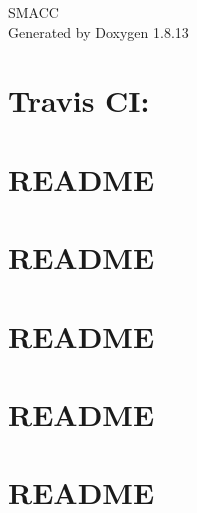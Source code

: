 \documentclass[twoside]{book}
\newcommand{\+}{\discretionary{\mbox{\scriptsize$\hookleftarrow$}}{}{}}
\newcommand{\clearemptydoublepage}{%
  \newpage{\pagestyle{empty}\cleardoublepage}%
}
\begin{document}
\hypersetup{pageanchor=false,
             bookmarksnumbered=true,
             pdfencoding=unicode
            }
\begin{titlepage}
\vspace*{7cm}
\begin{center}%
{\Large S\+M\+A\+CC }\\
\vspace*{1cm}
{\large Generated by Doxygen 1.8.13}\\
\end{center}
\end{titlepage}
\clearemptydoublepage
{}
\tableofcontents
\clearemptydoublepage
{}
\hypersetup{pageanchor=true}

\chapter{Travis CI\+:}
\label{md_README}

\chapter{R\+E\+A\+D\+ME}
\label{md_smacc_client_library_battery_monitor_client_README}

\chapter{R\+E\+A\+D\+ME}
\label{md_smacc_client_library_keyboard_client_README}

\chapter{R\+E\+A\+D\+ME}
\label{md_smacc_client_library_microstrain_mips_client_README}

\chapter{R\+E\+A\+D\+ME}
\label{md_smacc_client_library_move_base_z_client_README}

\chapter{R\+E\+A\+D\+ME}
\label{md_smacc_client_library_multirole_sensor_client_README}

\end{document}
